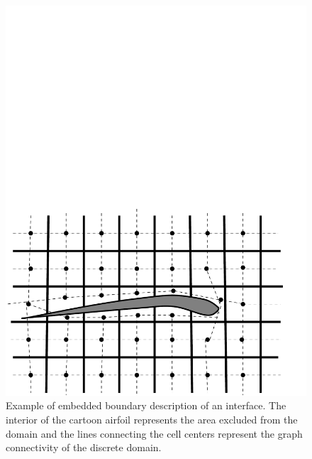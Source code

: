 \begin{figure}
  \centering
  \includegraphics[width=\textwidth]{./EB/graph.pdf}
\caption{Example of embedded boundary description of an interface. 
The interior of the cartoon airfoil represents the area
excluded from the domain and the lines connecting the cell centers
represent the graph connectivity of the discrete domain.    }
\label{fig::graph}
\end{figure}

